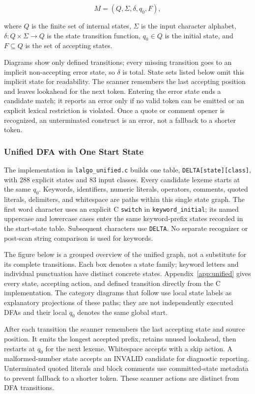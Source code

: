 \documentclass[11pt,a4paper]{article}
\newcommand{\codeinline}[1]{\texttt{#1}}
\begin{document}
\[
M = (Q, \Sigma, \delta, q_0, F),
\]

where $Q$ is the finite set of internal states, $\Sigma$ is the input character alphabet, $\delta:Q\times\Sigma\to Q$ is the state transition function, $q_0\in Q$ is the initial state, and $F\subseteq Q$ is the set of accepting states.

Diagrams show only defined transitions; every missing transition goes to an implicit non-accepting error state, so $\delta$ is total. State sets listed below omit this implicit state for readability. The scanner remembers the last accepting position and leaves lookahead for the next token. Entering the error state ends a candidate match; it reports an error only if no valid token can be emitted or an explicit lexical restriction is violated. Once a quote or comment opener is recognized, an unterminated construct is an error, not a fallback to a shorter token.

\subsubsection{Unified DFA with One Start State}\label{sec:unified}

The implementation in \codeinline{lalgo\_unified.c} builds one table, \codeinline{DELTA[state][class]}, with 288 explicit states and 83 input classes. Every candidate lexeme starts at the same $q_0$. Keywords, identifiers, numeric literals, operators, comments, quoted literals, delimiters, and whitespace are paths within this single state graph. The first word character uses an explicit C \codeinline{switch} in \codeinline{keyword\_initial}; its named uppercase and lowercase cases enter the same keyword-prefix states recorded in the start-state table. Subsequent characters use \codeinline{DELTA}. No separate recognizer or post-scan string comparison is used for keywords.

The figure below is a grouped overview of the unified graph, not a substitute for its complete transitions. Each box denotes a state family; keyword letters and individual punctuation have distinct concrete states. Appendix~\ref{app:unified} gives every state, accepting action, and defined transition directly from the C implementation. The category diagrams that follow use local state labels as explanatory projections of these paths; they are not independently executed DFAs and their local $q_0$ denotes the same global start.

After each transition the scanner remembers the last accepting state and source position. It emits the longest accepted prefix, retains unused lookahead, then restarts at $q_0$ for the next lexeme. Whitespace accepts with a skip action. A malformed-number state accepts an INVALID candidate for diagnostic reporting. Unterminated quoted literals and block comments use committed-state metadata to prevent fallback to a shorter token. These scanner actions are distinct from DFA transitions.
\end{document}
